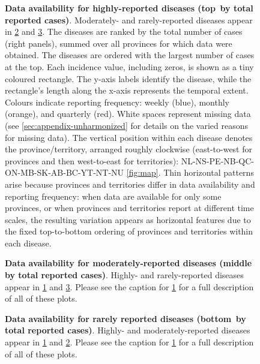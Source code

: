 \documentclass[12pt]{article}
\begin{document}
\begin{figure}[!htb]
\caption{\textbf{Data availability for highly-reported diseases (top \protect\,by total reported cases)}. Moderately- and rarely-reported diseases appear in \cref{fig:extent-2} and \cref{fig:extent-3}. The diseases are ranked by the total number of cases (right panels), summed over all provinces for which data were obtained. The diseases are ordered with the largest number of cases at the top. Each incidence value, including zeros, is shown as a tiny coloured rectangle. The y-axis labels identify the disease, while the rectangle's length along the x-axis represents the temporal extent. Colours indicate reporting frequency: weekly (blue), monthly (orange), and quarterly (red). White spaces represent missing data (see \cref{sec:appendix-unharmonized} for details on the varied reasons for missing data). The vertical position within each disease denotes the province/territory, arranged roughly clockwise (east-to-west for provinces and then west-to-east for territories): NL-NS-PE-NB-QC-ON-MB-SK-AB-BC-YT-NT-NU \cref{fig:map}. Thin horizontal patterns arise because provinces and territories differ in data availability and reporting frequency: when data are available for only some provinces, or when provinces and territories report at different time scales, the resulting variation appears as horizontal features due to the fixed top-to-bottom ordering of provinces and territories within each disease.}\label{fig:extent-1}
\end{figure}

\begin{figure}[!htb]
\caption{\textbf{Data availability for moderately-reported diseases (middle \protect\,by total reported cases)}. Highly- and rarely-reported diseases appear in \cref{fig:extent-1} and \cref{fig:extent-3}. Please see the caption for \cref{fig:extent-1} for a full description of all of these plots.}\label{fig:extent-2}
\end{figure}

\begin{figure}[!htb]
\caption{\textbf{Data availability for rarely reported diseases (bottom \protect\,by total reported cases)}. Highly- and moderately-reported diseases appear in \cref{fig:extent-1} and \cref{fig:extent-2}. Please see the caption for \cref{fig:extent-1} for a full description of all of these plots.}\label{fig:extent-3}
\end{figure}
\end{document}
